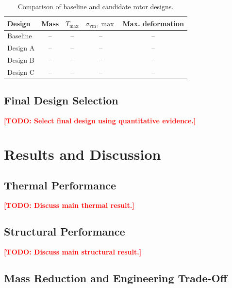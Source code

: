 \documentclass[11pt,a4paper]{article}
\newcommand{\todo}[1]{\textcolor{red}{\textbf{[TODO: #1]}}}
\newcommand{\Tmax}{T_{\mathrm{max}}}
\newcommand{\sigmavm}{\sigma_{\mathrm{vm}}}
\begin{document}
\begin{table}[H]
    \centering
    \caption{Comparison of baseline and candidate rotor designs.}
    \label{tab:design_comparison}
    \begin{tabular}{l c c c c}
        \toprule
        Design &
        Mass &
        $\Tmax$ &
        $\sigmavm,\max$ &
        Max. deformation \\
        \midrule

        Baseline & -- & -- & -- & -- \\
        Design A & -- & -- & -- & -- \\
        Design B & -- & -- & -- & -- \\
        Design C & -- & -- & -- & -- \\

        \bottomrule
    \end{tabular}
\end{table}


\subsection{Final Design Selection}

%
%

\todo{Select final design using quantitative evidence.}


\section{Results and Discussion}

\subsection{Thermal Performance}

\todo{Discuss main thermal result.}


\subsection{Structural Performance}

\todo{Discuss main structural result.}


\subsection{Mass Reduction and Engineering Trade-Off}
\end{document}
